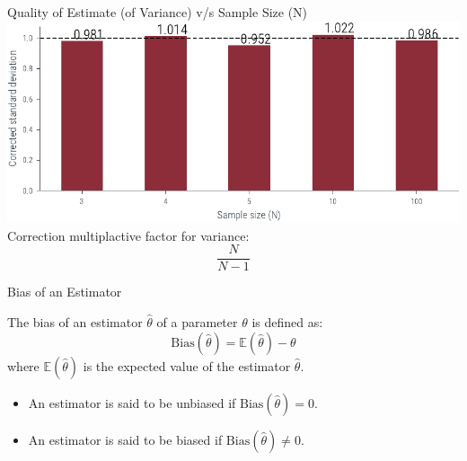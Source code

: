 \documentclass[handout]{beamer}
\begin{document}
\begin{frame}{Quality of Estimate (of Variance) v/s Sample Size (N)}
    \includegraphics[width=\textwidth]{../figures/corrected-mle-variance-quality.pdf}
Correction multiplactive factor for variance:
\[
    \frac{N}{N-1}
\]
\end{frame}
    

\begin{frame}{Bias of an Estimator}
    \begin{tcolorbox}[colback=metropolisblue!5,colframe=metropolisblue,title=Bias of an Estimator]
        The bias of an estimator $\hat{\theta}$ of a parameter $\theta$ is defined as:
        \[
            \text{Bias}(\hat{\theta}) = \mathbb{E}(\hat{\theta}) - \theta
        \]
        where $\mathbb{E}(\hat{\theta})$ is the expected value of the estimator $\hat{\theta}$.
    \end{tcolorbox}
    \begin{itemize}
        \item An estimator is said to be unbiased if $\text{Bias}(\hat{\theta}) = 0$.
        \item An estimator is said to be biased if $\text{Bias}(\hat{\theta}) \neq 0$.
    \end{itemize}
    
\end{frame}

\begin{frame}
    
\end{frame}


\end{document}

